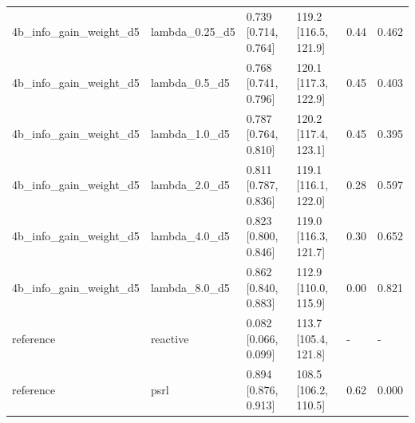 \begin{tabular}{llllll}
4b\_info\_gain\_weight\_d5 & lambda\_0.25\_d5 & 0.739 [0.714, 0.764] & 119.2 [116.5, 121.9] & 0.44 & 0.462 \\
4b\_info\_gain\_weight\_d5 & lambda\_0.5\_d5 & 0.768 [0.741, 0.796] & 120.1 [117.3, 122.9] & 0.45 & 0.403 \\
4b\_info\_gain\_weight\_d5 & lambda\_1.0\_d5 & 0.787 [0.764, 0.810] & 120.2 [117.4, 123.1] & 0.45 & 0.395 \\
4b\_info\_gain\_weight\_d5 & lambda\_2.0\_d5 & 0.811 [0.787, 0.836] & 119.1 [116.1, 122.0] & 0.28 & 0.597 \\
4b\_info\_gain\_weight\_d5 & lambda\_4.0\_d5 & 0.823 [0.800, 0.846] & 119.0 [116.3, 121.7] & 0.30 & 0.652 \\
4b\_info\_gain\_weight\_d5 & lambda\_8.0\_d5 & 0.862 [0.840, 0.883] & 112.9 [110.0, 115.9] & 0.00 & 0.821 \\
reference & reactive & 0.082 [0.066, 0.099] & 113.7 [105.4, 121.8] & - & - \\
reference & psrl & 0.894 [0.876, 0.913] & 108.5 [106.2, 110.5] & 0.62 & 0.000 \\
\bottomrule
\end{tabular}
